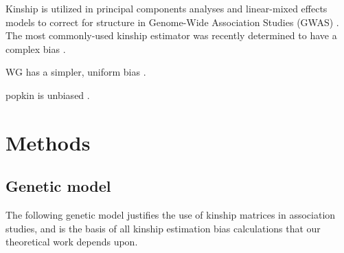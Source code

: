 \documentclass[11pt]{article}
\begin{document}
Kinship is utilized in principal components analyses and linear-mixed effects models to correct for structure in Genome-Wide Association Studies (GWAS) \citep{xie_combining_1998,yu_unified_2006, aulchenko_genomewide_2007, price_principal_2006, astle_population_2009,kang_efficient_2008, kang_variance_2010, yang_gcta:_2011, zhou_genome-wide_2012, yang_advantages_2014, loh_efficient_2015, sul_population_2018}.
The most commonly-used kinship estimator \citep{price_principal_2006, astle_population_2009, rakovski_kinship-based_2009, thornton_roadtrips:_2010, yang_common_2010, yang_gcta:_2011, zhou_genome-wide_2012, speed_improved_2012, yang_advantages_2014, speed_relatedness_2015, loh_efficient_2015, wang_efficient_2017, sul_population_2018} was recently determined to have a complex bias \citep{weir_unified_2017, ochoa_estimating_2021}.

WG has a simpler, uniform bias \citep{weir_unified_2017, ochoa_estimating_2021}.

popkin is unbiased  \citep{ochoa_estimating_2021}.

\section{Methods}

\subsection{Genetic model}

The following genetic model justifies the use of kinship matrices in association studies, and is the basis of all kinship estimation bias calculations that our theoretical work depends upon.
\end{document}
